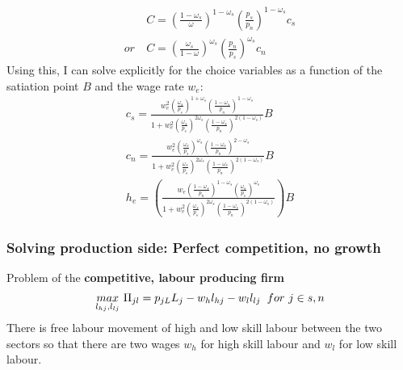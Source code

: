 \begin{align*}
&C= \left(\frac{1-\omega_s}{\omega}\right)^{1-\omega_s}\left(\frac{p_s}{p_n}\right)^{1-\omega_s}c_s\\
or\ & C= \left(\frac{\omega_s}{1-\omega}\right)^{\omega_s}\left(\frac{p_n}{p_s}\right)^{\omega_s}c_n
\end{align*} 
Using this, I can solve explicitly for the choice variables as a function of the satiation point $B$ and the wage rate $w_e$:
\begin{align}
c_s=\frac{w_e^2\left(\frac{\omega_s}{p_s}\right)^{1+\omega_s}\left(\frac{1-\omega_s}{p_n}\right)^{1-\omega_s}}{1+w_e^2\left(\frac{\omega_s}{p_s}\right)^{2\omega_s}\left(\frac{1-\omega_s}{p_n}\right)^{2(1-\omega_s)}}B\\
c_n=\frac{w_e^2\left(\frac{\omega_s}{p_s}\right)^{\omega_s}\left(\frac{1-\omega_s}{p_n}\right)^{2-\omega_s}}{1+w_e^2\left(\frac{\omega_s}{p_s}\right)^{2\omega_s}\left(\frac{1-\omega_s}{p_n}\right)^{2(1-\omega_s)}}B\\
h_e=\left(
\frac{w_e \left(\frac{1-\omega_s}{p_n}\right)^{1-\omega_s}\left(\frac{\omega_s}{p_s}\right)^{\omega_s}}{1+w_e^2\left(\frac{\omega_s}{p_s}\right)^{2\omega_s}\left(\frac{1-\omega_s}{p_n}\right)^{2(1-\omega_s)}}\right)B
\end{align}

\subsubsection{Solving production side: Perfect competition, no growth}
Problem of the \textbf{competitive, labour producing firm}
\begin{align*}
\underset{l_{hj}, l_{lj}}{max}\  \Pi_{jl}=p_{jL}L_j-w_hl_{hj}-w_ll_{lj} \hspace{2mm} for \ j\in{s,n}
\end{align*}
There is free labour movement of high and low skill labour between the two sectors so that there are two wages $w_h$ for high skill labour and $w_l$ for low skill labour. 

